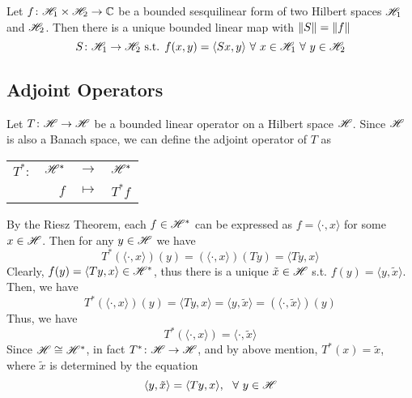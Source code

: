 \documentclass[a4paper,11pt]{report}
\begin{document}
\begin{thm} \label{thm7}
	Let $f \colon \mathscr{H}_1 \times \mathscr{H}_2 \rightarrow \mathbb{C}$ be a bounded sesquilinear form of two Hilbert spaces $\mathscr{H}_1$ and $\mathscr{H}_2$. Then there is a unique bounded linear map with $\left\lVert S\right\lVert = \left\lVert f\right\lVert$
	\begin{equation*}
		S \colon \mathscr{H}_1 \rightarrow \mathscr{H}_2 \text{ s.t. } f(x,y)= \langle Sx,y \rangle ~\forall~ x \in \mathscr{H}_1 ~\forall~ y \in \mathscr{H}_2
	\end{equation*}
\end{thm}

\subsection{Adjoint Operators}

Let $T \colon \mathscr{H} \rightarrow \mathscr{H}$ be a bounded linear operator on a Hilbert space $\mathscr{H}$. Since $\mathscr{H}$ is also a Banach space, we can define the adjoint operator of $T$ as 
\begin{center}
	\begin{tabular}{l r c l}
		$T^{*} \colon$ & $\mathscr{H}^{*}$ & $\longrightarrow$ & $\mathscr{H}^{*}$ \\			~ & $f$ & $\longmapsto$ & $T^{*}f$
	\end{tabular}
\end{center}
By the Riesz Theorem, each $f \in \mathscr{H}^{*}$ can be expressed as $f = \langle \cdot, x \rangle$ for some $x \in \mathscr{H}$. Then for any $y \in \mathscr{H}$ we have
\begin{equation*}
	T^{*}(\langle \cdot, x \rangle)(y) = (\langle \cdot, x \rangle)(Ty) =\langle Ty, x \rangle 
\end{equation*}
Clearly, $f(y) = \langle Ty, x \rangle  \in \mathscr{H}^{*}$, thus there is a unique $\tilde{x} \in \mathscr{H}$ s.t. $f(y) = \langle y, \tilde{x} \rangle$. Then, we have 
\begin{equation*}
	T^{*}(\langle \cdot, x \rangle)(y) = \langle Ty, x \rangle = \langle y, \tilde{x} \rangle = (\langle \cdot, \tilde{x} \rangle)(y)
\end{equation*}
Thus, we have 
\begin{equation*}
	T^{*}(\langle \cdot, x \rangle) = \langle \cdot, \tilde{x} \rangle
\end{equation*}
Since $\mathscr{H} \cong \mathscr{H}^{*}$, in fact $T^{*} \colon \mathscr{H} \rightarrow \mathscr{H}$, and by above mention, $T^{*}(x) = \tilde{x}$, where $\tilde{x}$ is determined by the equation
\begin{equation*}
	\langle y, \tilde{x} \rangle = \langle Ty, x \rangle,~~ \forall~ y \in \mathscr{H}
\end{equation*}
\end{document}
